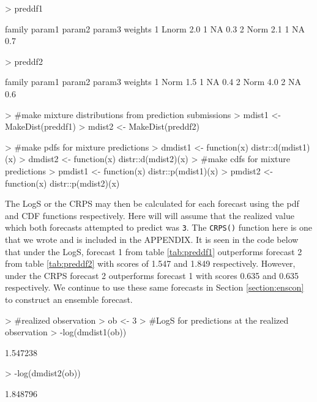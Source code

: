 \documentclass[11pt,notitlepage]{isuthesis}
\begin{document}
\begin{Schunk}
\begin{Sinput}
> preddf1
\end{Sinput}
\begin{Soutput}
  family param1 param2 param3 weights
1  Lnorm    2.0      1     NA     0.3
2   Norm    2.1      1     NA     0.7
\end{Soutput}
\begin{Sinput}
> preddf2
\end{Sinput}
\begin{Soutput}
  family param1 param2 param3 weights
1   Norm    1.5      1     NA     0.4
2   Norm    4.0      2     NA     0.6
\end{Soutput}
\begin{Sinput}
> #make mixture distributions from prediction submissions
> mdist1 <- MakeDist(preddf1)
> mdist2 <- MakeDist(preddf2)
\end{Sinput}
\end{Schunk}

\begin{Schunk}
\begin{Sinput}
> #make pdfs for mixture predictions
> dmdist1 <- function(x) {distr::d(mdist1)(x)}
> dmdist2 <- function(x) {distr::d(mdist2)(x)}
> #make cdfs for mixture predictions
> pmdist1 <- function(x) {distr::p(mdist1)(x)}
> pmdist2 <- function(x) {distr::p(mdist2)(x)}
\end{Sinput}
\end{Schunk}




The LogS or the CRPS may then be calculated for each forecast using the pdf
and CDF functions respectively. Here will will assume that the realized value
which both forecasts attempted to predict was \texttt{3}. 
The \texttt{CRPS()} function
here is one that we wrote and is
included in the APPENDIX. It is seen in the code below that under the
LogS, forecast 1 from table \ref{tab:preddf1} outperforms forecast 2 from table
\ref{tab:preddf2} with scores of 1.547 and 
1.849 respectively. 
However, under the CRPS forecast 2 outperforms forecast 1
with scores 0.635 and 
0.635 respectively. We continue to use these same
forecasts in Section \ref{section:enscon} to construct an ensemble forecast.

\begin{Schunk}
\begin{Sinput}
> #realized observation
> ob <- 3
> #LogS for predictions at the realized observation
> -log(dmdist1(ob))
\end{Sinput}
\begin{Soutput}
[1] 1.547238
\end{Soutput}
\begin{Sinput}
> -log(dmdist2(ob))
\end{Sinput}
\begin{Soutput}
[1] 1.848796
\end{Soutput}
\end{Schunk}
\end{document}
